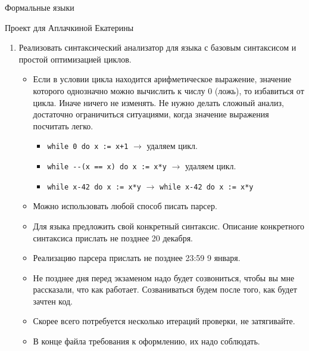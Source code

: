 \documentclass[12pt]{article}
\begin{document}
\begin{center}
{\LARGE Формальные языки}

{\Large Проект для Аплачкиной Екатерины}

\end{center}

\bigskip

\begin{enumerate}
  \item {Реализовать синтаксический анализатор для языка с базовым синтаксисом и простой оптимизацией циклов. }
  \begin{itemize}
    \item Если в условии цикла находится арифметическое выражение, значение которого однозначно можно вычислить к числу 0 (ложь), то избавиться от цикла. Иначе ничего не изменять. Не нужно делать сложный анализ, достаточно ограничиться ситуациями, когда значение выражения посчитать легко.
    \begin{itemize}
      \item \verb!while 0 do x := x+1! $\to$ удаляем цикл.
      \item \verb!while --(x == x) do x := x*y! $\to$ удаляем цикл.
      \item \verb!while x-42 do x := x*y! $\to$ \verb!while x-42 do x := x*y!
    \end{itemize}
    \item Можно использовать любой способ писать парсер.
    \item Для языка предложить свой конкретный синтаксис. Описание конкретного синтаксиса прислать не позднее 20 декабря.
    \item Реализацию парсера прислать не позднее 23:59 9 января.
    \item Не позднее дня перед экзаменом надо будет созвониться, чтобы вы мне рассказали, что как работает. Созваниваться будем после того, как будет зачтен код.
    \item Скорее всего потребуется несколько итераций проверки, не затягивайте.
    \item В конце файла требования к оформлению, их надо соблюдать.
  \end{itemize}

\end{enumerate}



\bigskip


\end{document}
